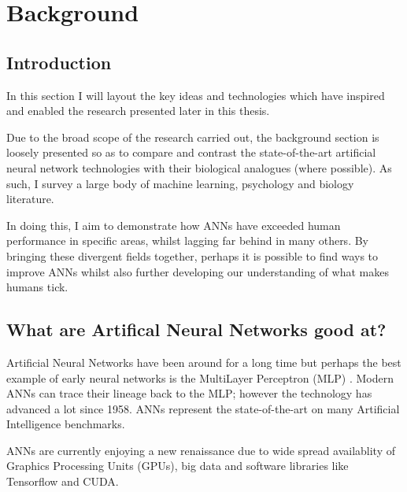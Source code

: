 
\chapter{Background} %

\label{Chapter2} %



\section{Introduction}\label{Lit:Intro}
In this section I will layout the key ideas and technologies which have inspired and enabled the research presented later in this thesis.

Due to the broad scope of the research carried out, the background section is loosely presented so as to compare and contrast the state-of-the-art artificial neural network technologies with their biological analogues (where possible). As such, I survey a large body of machine learning, psychology and biology literature.

In doing this, I aim to demonstrate how ANNs have exceeded human performance in specific areas, whilst lagging far behind in many others. By bringing these divergent fields together, perhaps it is possible to find ways to improve ANNs whilst also further developing our understanding of what makes humans tick. 


\section{What are Artifical Neural Networks good at?}
Artificial Neural Networks have been around for a long time but perhaps the best example of early neural networks is the MultiLayer Perceptron (MLP) \cite{rosenblatt1958perceptron}. Modern ANNs can trace their lineage back to the MLP; however the technology has advanced a lot since 1958. ANNs represent the state-of-the-art on many Artificial Intelligence benchmarks.

ANNs are currently enjoying a new renaissance due to wide spread availablity of Graphics Processing Units (GPUs), big data and software libraries like Tensorflow and CUDA.

